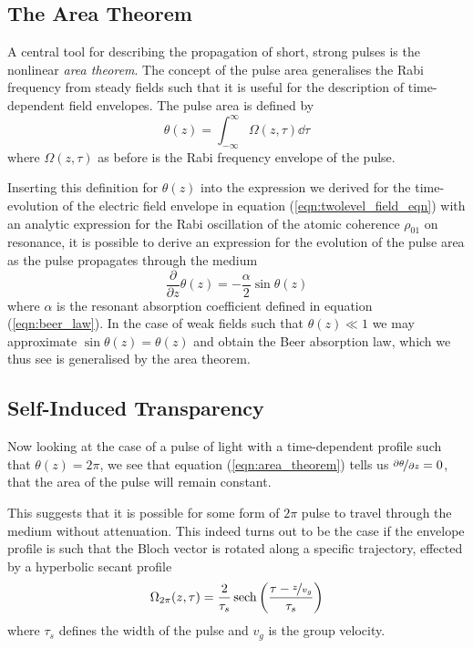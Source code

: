   \subsection{The Area Theorem}  

    A central tool for describing the propagation of short, strong pulses is the
    nonlinear \textit{area theorem}.\cite{McCall1969} The concept of the pulse
    area generalises the Rabi frequency from steady fields such that it is
    useful for the description of time-dependent field envelopes. The
    pulse area is defined by
    \begin{equation}
      \theta(z) = \int^{\infty}_{-\infty} \Omega(z, \tau) \dd \tau
      \label{eqn:pulse_area}
    \end{equation}
    where $\Omega(z, \tau)$ as before is the Rabi frequency envelope of the
    pulse.

    Inserting this definition for $\theta(z)$ into the expression we derived for
    the time-evolution of the electric field envelope in equation 
    (\ref{eqn:twolevel_field_eqn}) with an analytic expression for the Rabi
    oscillation of the atomic coherence $\rho_{01}$ on resonance, it is possible
    to derive an expression for the evolution of the pulse area as the pulse
    propagates through the medium
    \begin{equation}
      \frac{\partial}{\partial z} \theta(z) = -\frac{\alpha}{2} \sin{\theta(z)}
      \label{eqn:area_theorem}
    \end{equation}
    where $\alpha$ is the resonant absorption coefficient defined in equation
    (\ref{eqn:beer_law}). In the case of weak fields such that $\theta(z) \ll 1$
    we may approximate $\sin{\theta(z)} = \theta(z)$ and obtain the Beer absorption
    law, which we thus see is generalised by the area theorem.

  \subsection{Self-Induced Transparency} 

    Now looking at the case of a pulse of light with a time-dependent profile
    such that $\theta(z) = 2\pi$, we see that equation (\ref{eqn:area_theorem})
    tells us $\nicefrac{\partial \theta}{\partial z} = 0$, \ie that the area of
    the pulse will remain constant.

    This suggests that it is possible for some form of $2\pi$ pulse to travel
    through the medium without attenuation. This indeed turns out to be the case
    if the envelope profile is such that the Bloch vector is rotated along
    a specific trajectory, effected by a hyperbolic secant profile
    \begin{equation}
      \Omega_{2\pi}(z, \tau) = \frac{2}{\tau_{s}} 
          \operatorname{sech}\left(\frac{\tau - \nicefrac{z}{v_g}}{\tau_s}\right)
      \label{eqn:sech_shape}
    \end{equation}
    where $\tau_s$ defines the width of the pulse and $v_g$ is the group
    velocity.

